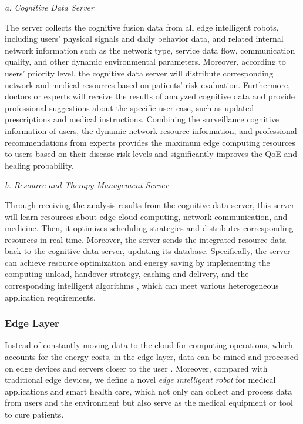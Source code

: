 \documentclass[letterpaper]{article} %
\begin{document}
\textit{a. Cognitive Data Server}

The server collects the cognitive fusion data from all edge intelligent robots, including users' physical signals and daily behavior data, and related internal network information such as the network type, service data flow, communication quality, and other dynamic environmental parameters. Moreover, according to users' priority level, the cognitive data server will distribute corresponding network and medical resources based on patients' risk evaluation. Furthermore, doctors or experts will receive the results of analyzed cognitive data and provide professional suggestions about the specific user case, such as updated prescriptions and medical instructions. Combining the surveillance cognitive information of users, the dynamic network resource information, and professional recommendations from experts provides the maximum edge computing resources to users based on their disease risk levels and significantly improves the QoE and healing probability.

\textit{b. Resource and Therapy Management Server}

Through receiving the analysis results from the cognitive data server, this server will learn resources about edge cloud computing, network communication, and medicine. Then, it optimizes scheduling strategies and distributes corresponding resources in real-time. Moreover, the server sends the integrated resource data back to the cognitive data server, updating its database. Specifically, the server can achieve resource optimization and energy saving by implementing the computing unload, handover strategy, caching and delivery, and the corresponding intelligent algorithms \cite{chen2018edge}, which can meet various heterogeneous application requirements.

\subsubsection{Edge Layer}

Instead of constantly moving data to the cloud for computing operations, which accounts for the energy costs, in the edge layer, data can be mined and processed on edge devices and servers closer to the user \cite{bhargava2017fog}. Moreover, compared with traditional edge devices, we define a novel \textit{edge intelligent robot} for medical applications and smart health care, which not only can collect and process data from users and the environment but also serve as the medical equipment or tool to cure patients.
\end{document}
